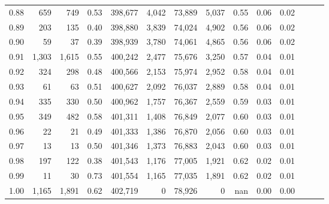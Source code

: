 \begin{tabular}{rrrrrrrrrrrrrr}
0.88 &     659 &    749 &  0.53 &  398,677 &    4,042 &  73,889 &   5,037 &  0.55 &  0.06 &      0.02 \\
0.89 &     203 &    135 &  0.40 &  398,880 &    3,839 &  74,024 &   4,902 &  0.56 &  0.06 &      0.02 \\
0.90 &      59 &     37 &  0.39 &  398,939 &    3,780 &  74,061 &   4,865 &  0.56 &  0.06 &      0.02 \\
0.91 &   1,303 &  1,615 &  0.55 &  400,242 &    2,477 &  75,676 &   3,250 &  0.57 &  0.04 &      0.01 \\
0.92 &     324 &    298 &  0.48 &  400,566 &    2,153 &  75,974 &   2,952 &  0.58 &  0.04 &      0.01 \\
0.93 &      61 &     63 &  0.51 &  400,627 &    2,092 &  76,037 &   2,889 &  0.58 &  0.04 &      0.01 \\
0.94 &     335 &    330 &  0.50 &  400,962 &    1,757 &  76,367 &   2,559 &  0.59 &  0.03 &      0.01 \\
0.95 &     349 &    482 &  0.58 &  401,311 &    1,408 &  76,849 &   2,077 &  0.60 &  0.03 &      0.01 \\
0.96 &      22 &     21 &  0.49 &  401,333 &    1,386 &  76,870 &   2,056 &  0.60 &  0.03 &      0.01 \\
0.97 &      13 &     13 &  0.50 &  401,346 &    1,373 &  76,883 &   2,043 &  0.60 &  0.03 &      0.01 \\
0.98 &     197 &    122 &  0.38 &  401,543 &    1,176 &  77,005 &   1,921 &  0.62 &  0.02 &      0.01 \\
0.99 &      11 &     30 &  0.73 &  401,554 &    1,165 &  77,035 &   1,891 &  0.62 &  0.02 &      0.01 \\
1.00 &   1,165 &  1,891 &  0.62 &  402,719 &        0 &  78,926 &       0 &   nan &  0.00 &      0.00 \\
\bottomrule
\end{tabular}
